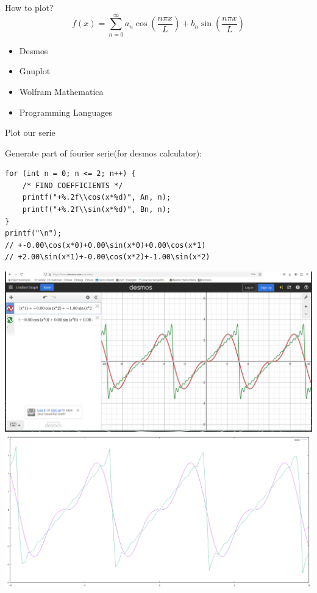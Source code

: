 \documentclass[xcolor={rgb}]{beamer}
\begin{document}
	\begin{frame}[fragile]{How to plot?}
		\onslide<+->
		\[ f(x) = \sum_{n=0}^{\infty}a_n \cos(\frac{n \pi x}{L})+b_n \sin(\frac{n \pi x}{L}) \]

		\begin{itemize}
			\pause\item Desmos
			\pause\item Gnuplot
			\pause\item Wolfram Mathematica
			\pause\item Programming Languages
		\end{itemize}
	\end{frame}

	\begin{frame}[fragile]{Plot our serie}
		\vspace*{1cm}
		\begin{overprint}
			Generate part of fourier serie(for desmos calculator):
			\begin{verbatim}
for (int n = 0; n <= 2; n++) {
	/* FIND COEFFICIENTS */
	printf("+%.2f\\cos(x*%d)", An, n);
	printf("+%.2f\\sin(x*%d)", Bn, n);
}
printf("\n");
// +-0.00\cos(x*0)+0.00\sin(x*0)+0.00\cos(x*1)
// +2.00\sin(x*1)+-0.00\cos(x*2)+-1.00\sin(x*2)
			\end{verbatim}
			\includegraphics[width=\textwidth]{assets/desmos.png}
			\onslide<3>
			\includegraphics[width=\textwidth]{assets/gnuplot.png}
		\end{overprint}
	\end{frame}
\end{document}
